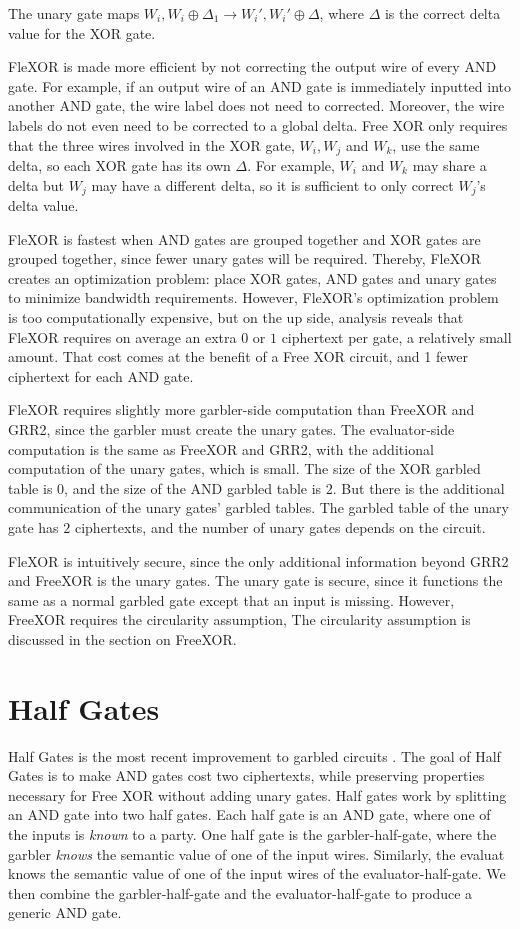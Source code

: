 The unary gate maps $W_i,W_i \oplus \Delta_1 \to W_i', W_i' \oplus \Delta$, where $\Delta$ is the correct delta value for the XOR gate.

FleXOR is made more efficient by not correcting the output wire of every AND gate.
For example, if an output wire of an AND gate is immediately inputted into another AND gate, the wire label does not need to corrected.
Moreover, the wire labels do not even need to be corrected to a global delta.
Free XOR only requires that the three wires involved in the XOR gate, $W_i, W_j$ and $W_k$, use the same delta, so each XOR gate has its own $\Delta$.
For example, $W_i$ and $W_k$ may share a delta but $W_j$ may have a different delta, so it is sufficient to only correct $W_j$'s delta value.

FleXOR is fastest when AND gates are grouped together and XOR gates are grouped together, since fewer unary gates will be required.
Thereby, FleXOR creates an optimization problem: place XOR gates, AND gates and unary gates to minimize bandwidth requirements.
However, FleXOR's optimization problem is too computationally expensive, but on the up side, analysis reveals that FleXOR requires on average an extra $0$ or $1$ ciphertext per gate, a relatively small amount.
That cost comes at the benefit of a Free XOR circuit, and 1 fewer ciphertext for each AND gate.

FleXOR requires slightly more garbler-side computation than FreeXOR and GRR2, since the garbler must create the unary gates.
The evaluator-side computation is the same as FreeXOR and GRR2, with the additional computation of the unary gates, which is small.
The size of the XOR garbled table is $0$, and the size of the AND garbled table is $2$.
But there is the additional communication of the unary gates' garbled tables.
The garbled table of the unary gate has $2$ ciphertexts, and the number of unary gates depends on the circuit.

FleXOR is intuitively secure, since the only additional information beyond GRR2 and FreeXOR is the unary gates.
The unary gate is secure, since it functions the same as a normal garbled gate except that an input is missing.
However, FreeXOR requires the circularity assumption, 
The circularity assumption is discussed in the section on FreeXOR.

\section{Half Gates}
Half Gates is the most recent improvement to garbled circuits \cite{two halves}.
The goal of Half Gates is to make AND gates cost two ciphertexts, while preserving properties necessary for Free XOR without adding unary gates. 
Half gates work by splitting an AND gate into two half gates.
Each half gate is an AND gate, where one of the inputs is \textit{known} to a party.
One half gate is the garbler-half-gate, where the garbler \textit{knows} the semantic value of one of the input wires.
Similarly, the evaluat knows the semantic value of one of the input wires of the evaluator-half-gate.
We then combine the garbler-half-gate and the evaluator-half-gate to produce a generic AND gate.

